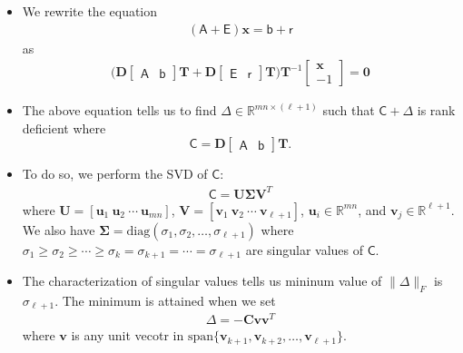 \documentclass[10pt]{article}
\newcommand{\ve}[1]{\mathbf{#1}}
\newcommand{\msf}[1]{\mathsf{#1}}
\newcommand{\mrm}[1]{\mathrm{#1}}
\begin{document}
\begin{itemize}
    \item We rewrite the equation
      \begin{align*}
        (\msf{A} + \msf{E})\ve{x} = \msf{b} + \msf{r}
      \end{align*}
      as 
      \begin{align*}
        \bigg( \ve{D} \left[ \begin{array}{c|c} \msf{A} & \msf{b} \end{array} \right] \ve{T} + \ve{D} \left[ \begin{array}{c|c} \msf{E} & \msf{r} \end{array} \right] \ve{T} \bigg) \ve{T}^{-1}
        \begin{bmatrix}
          \ve{x} \\
          -1
        \end{bmatrix} = \ve{0}
      \end{align*}
      
    \item The above equation tells us to find $\Delta \in \mathbb{R}^{mn \times (\ell+1)}$ such that $\msf{C} + \Delta$ is rank deficient where
    $$ \msf{C} = \ve{D} \left[ \begin{array}{c|c} \msf{A} & \msf{b} \end{array} \right] \ve{T}.$$
    
    \item To do so, we perform the SVD of $\msf{C}$:
      \begin{align*}
        \msf{C} = \ve{U} \ve{\Sigma} \ve{V}^T
      \end{align*}
      where $\ve{U} = [ \ve{u}_1 \ \ve{u}_2\ \dotsb\ \ve{u}_{mn} ]$,
      $\ve{V} = [\ve{v}_1 \ \ve{v}_2 \ \dotsb\ \ve{v}_{\ell+1} ]$,
      $\ve{u}_i \in \mathbb{R}^{mn}$, and 
      $\ve{v}_j \in \mathbb{R}^{\ell+1}.$ We also have
      $\ve{\Sigma} = \mrm{diag}(\sigma_1, \sigma_2, \dotsc, \sigma_{\ell+1})$
      where $\sigma_1 \geq \sigma_2 \geq \dotsb \geq \sigma_k = \sigma_{k+1} = \dotsb = \sigma_{\ell+1}$
      are singular values of $\msf{C}$.
      
    \item The characterization of singular values tells us mininum 
      value of $\| \Delta \|_F$ is $\sigma_{\ell+1}$. The minimum
      is attained when we set
      \begin{align*}
        \Delta = - \ve{C}\ve{v} \ve{v}^T
      \end{align*}
      where $\ve{v}$ is any unit vecotr in
      $\mrm{span}\{\ve{v}_{k+1}, \ve{v}_{k+2}, \dotsc, \ve{v}_{\ell+1}\}.$
      

\end{itemize}
\end{document}
